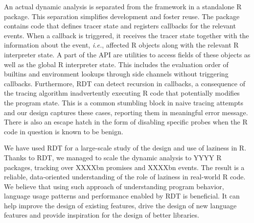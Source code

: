 \documentclass[acmsmall,review]{acmart}
\newcommand{\Ie}{\emph{i.e.}\xspace}
\newcommand{\RDT}{RDT\xspace}
\begin{document}
\bigskip
\indent An actual dynamic analysis is separated from the framework in a
standalone R package. This separation simplifies development and foster reuse.
The package contains code that defines tracer state and registers callbacks for
the relevant events. When a callback is triggered, it receives the tracer state
together with the information about the event, \Ie, affected R objects along
with the relevant R interpreter state. A part of the API are utilities to
access fields of these objects as well as the global R interpreter state. This
includes the evaluation order of builtins and environment lookups through side
channels without triggering callbacks. Furthermore, \RDT can detect recursion
in callbacks, a consequence of the tracing algorithm inadvertently executing R
code that potentially modifies the program state. This is a common stumbling
block in naive tracing attempts and our design captures these cases, reporting
them in meaningful error message. There is also an escape hatch in the form of
disabling specific probes when the R code in question is known to be benign.

We have used RDT for a large-scale study of the design and use of laziness in
R. Thanks to RDT, we managed to scale the dynamic analysis to YYYY R packages,
tracking over XXXXbn promises and XXXXbn events. The result is a reliable,
data-oriented understanding of the role of laziness in real-world R code.
%
We believe that using such approach of understanding program behavior, language
usage patterns and performance enabled by RDT is beneficial. It can help
improve the design of existing features, drive the design of new language
features and provide inspiration for the design of better libraries.
\end{document}

